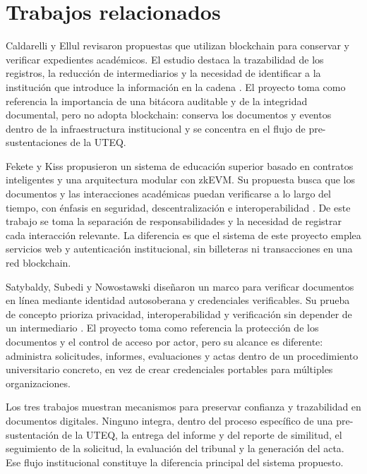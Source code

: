 \section{Trabajos relacionados}

Caldarelli y Ellul revisaron propuestas que utilizan blockchain para conservar
y verificar expedientes académicos. El estudio destaca la trazabilidad de los
registros, la reducción de intermediarios y la necesidad de identificar a la
institución que introduce la información en la cadena
\cite{Caldarelli2021}. El proyecto toma como referencia la importancia de una
bitácora auditable y de la integridad documental, pero no adopta blockchain:
conserva los documentos y eventos dentro de la infraestructura institucional y
se concentra en el flujo de pre-sustentaciones de la UTEQ.

Fekete y Kiss propusieron un sistema de educación superior basado en contratos
inteligentes y una arquitectura modular con zkEVM. Su propuesta busca que los
documentos y las interacciones académicas puedan verificarse a lo largo del
tiempo, con énfasis en seguridad, descentralización e interoperabilidad
\cite{Fekete2023}. De este trabajo se toma la separación de responsabilidades y
la necesidad de registrar cada interacción relevante. La diferencia es que el
sistema de este proyecto emplea servicios web y autenticación institucional,
sin billeteras ni transacciones en una red blockchain.

Satybaldy, Subedi y Nowostawski diseñaron un marco para verificar documentos en
línea mediante identidad autosoberana y credenciales verificables. Su prueba de
concepto prioriza privacidad, interoperabilidad y verificación sin depender de
un intermediario \cite{Satybaldy2022}. El proyecto toma como referencia la
protección de los documentos y el control de acceso por actor, pero su alcance
es diferente: administra solicitudes, informes, evaluaciones y actas dentro de
un procedimiento universitario concreto, en vez de crear credenciales
portables para múltiples organizaciones.

Los tres trabajos muestran mecanismos para preservar confianza y trazabilidad
en documentos digitales. Ninguno integra, dentro del proceso específico de una
pre-sustentación de la UTEQ, la entrega del informe y del reporte de similitud,
el seguimiento de la solicitud, la evaluación del tribunal y la generación del
acta. Ese flujo institucional constituye la diferencia principal del sistema
propuesto.
